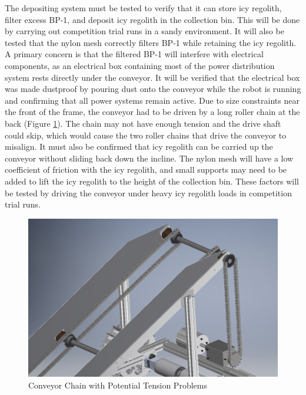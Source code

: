 \documentclass[class=article, crop=false]{standalone}
\begin{document}
	The depositing system must be tested to verify that it can store icy regolith, filter excess BP-1, and deposit icy regolith in the collection bin. This will be done by carrying out competition trial runs in a sandy environment. It will also be tested that the nylon mesh correctly filters BP-1 while retaining the icy regolith. A primary concern is that the filtered BP-1 will interfere with electrical components, as an electrical box containing most of the power distribution system rests directly under the conveyor. It will be verified that the electrical box was made dustproof by pouring dust onto the conveyor while the robot is running and confirming that all power systems remain active.
	Due to size constraints near the front of the frame, the conveyor had to be driven by a long roller chain at the back (Figure \ref{fig:conveyor_chain}). The chain may not have enough tension and the drive shaft could skip, which would cause the two roller chains that drive the conveyor to misalign. It must also be confirmed that icy regolith can be carried up the conveyor without sliding back down the incline. The nylon mesh will have a low coefficient of friction with the icy regolith, and small supports may need to be added to lift the icy regolith to the height of the collection bin. These factors will be tested by driving the conveyor under heavy icy regolith loads in competition trial runs.
		
	
	\FloatBarrier
		\begin{figure}[h]
			\centering
			\includegraphics[width=0.5\linewidth]{09_Figures/conveyor_roller_chain.png}
			\caption{Conveyor Chain with Potential Tension Problems}
			\label{fig:conveyor_chain}
		\end{figure}
		\FloatBarrier
		
	
			
	
	
\end{document}
